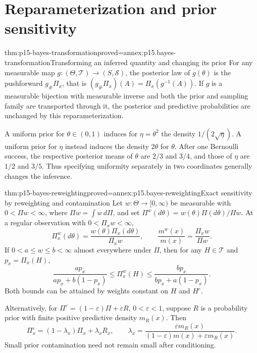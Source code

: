 \section{Reparameterization and prior sensitivity}
\label{sec:p15-bayes-prior-sensitivity}

\begin{hbtheorem}{thm:p15-bayes-transformation}{proved=annex:p15.bayes-transformation}{Transforming an inferred quantity and changing its prior}
For any measurable map \(g:(\Theta,\mathcal T)\to(S,\mathcal S)\),
the posterior law of \(g(\theta)\)
is the pushforward \(g_\#\Pi_x\), that is
\((g_\#\Pi_x)(A)=\Pi_x(g^{-1}(A))\).
If \(g\) is a measurable bijection with measurable inverse and both
the prior and sampling family are transported through it, the posterior
and predictive probabilities are unchanged by this reparameterization.

A uniform prior for \(\theta\in(0,1)\) induces for
\(\eta=\theta^2\) the density \(1/(2\sqrt\eta)\).
A uniform prior for \(\eta\) instead induces the density \(2\theta\)
for \(\theta\). After one Bernoulli success, the respective posterior
means of \(\theta\) are \(2/3\) and \(3/4\), and those of \(\eta\)
are \(1/2\) and \(3/5\). Thus specifying uniformity separately in
two coordinates generally changes the inference.
\end{hbtheorem}

\begin{hbtheorem}{thm:p15-bayes-reweighting}{proved=annex:p15.bayes-reweighting}{Exact sensitivity by reweighting and contamination}
Let \(w:\Theta\to[0,\infty)\) be measurable with
\(0<\Pi w<\infty\), where \(\Pi w=\int w\,d\Pi\), and set
\(\Pi^w(d\theta)=w(\theta)\Pi(d\theta)/\Pi w\).
At a regular observation with \(0<\Pi_xw<\infty\),
\[
 \Pi_x^w(d\theta)=\frac{w(\theta)\Pi_x(d\theta)}{\Pi_xw},
 \qquad \frac{m^w(x)}{m(x)}=\frac{\Pi_xw}{\Pi w}.
\]
If \(0<a\leq w\leq b<\infty\) almost everywhere under \(\Pi\),
then for any \(H\in\mathcal T\) and \(p_x=\Pi_x(H)\),
\[
 \frac{ap_x}{ap_x+b(1-p_x)}
 \leq\Pi_x^w(H)\leq
 \frac{bp_x}{bp_x+a(1-p_x)}.
\]
Both bounds can be attained by weights constant on \(H\) and \(H^c\).

Alternatively, for \(\Pi^\varepsilon=(1-\varepsilon)\Pi+\varepsilon R\),
\(0<\varepsilon<1\), suppose \(R\) is a probability prior with
finite positive predictive density \(m_R(x)\). Then
\[
 \Pi_x^\varepsilon=(1-\lambda_x)\Pi_x+\lambda_x R_x,\qquad
 \lambda_x=\frac{\varepsilon m_R(x)}
                  {(1-\varepsilon)m(x)+\varepsilon m_R(x)}.
\]
Small prior contamination need not remain small after conditioning.
\end{hbtheorem}


